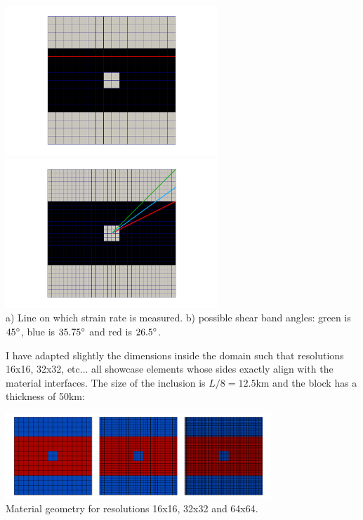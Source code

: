 \begin{center}
\includegraphics[width=8cm]{python_codes/fieldstone_39/results_shortening_block/line}
\includegraphics[width=8cm]{python_codes/fieldstone_39/results_shortening_block/angles}\\
{\captionfont a) Line on which strain rate is measured. b) possible shear band angles:
green is $45\degree$, blue is $35.75\degree$ and red is $26.5\degree$.}
\end{center}


I have adapted slightly the dimensions inside the domain such that resolutions 16x16, 32x32, etc...
all showcase elements whose sides exactly align with the material interfaces. The size of the inclusion is 
$L/8=12.5$km and the block has a thickness of 50km:

\begin{center}
\includegraphics[width=10cm]{python_codes/fieldstone_39/results_shortening_block/geometry}\\
{\captionfont Material geometry for resolutions 16x16, 32x32 and 64x64.}
\end{center}


